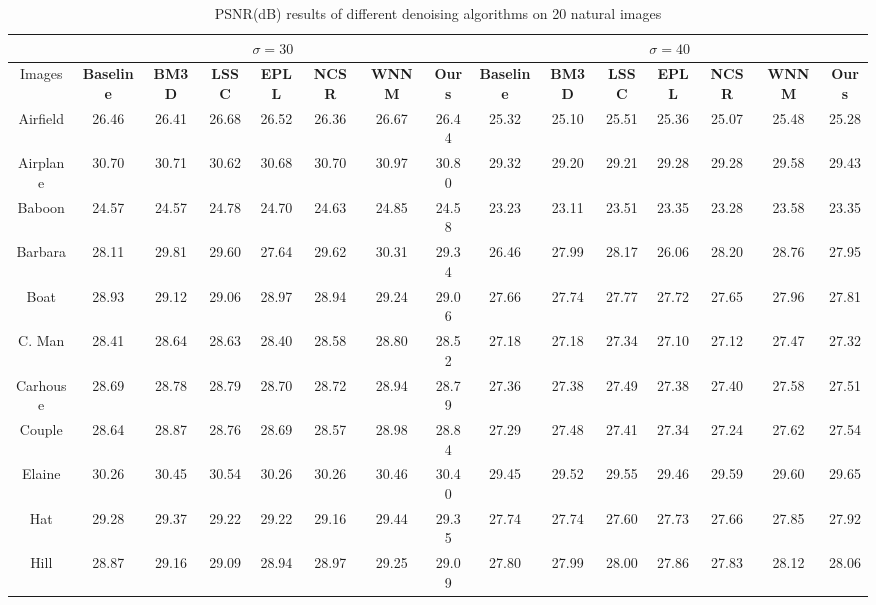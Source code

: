 \documentclass[10pt,twocolumn,letterpaper]{article}
\begin{document}
\begin{table*}[t]\label{tab1}
\caption{PSNR(dB) results of different denoising algorithms on 20 natural images}
\begin{center}
\renewcommand\arraystretch{1.0}
\scriptsize
\begin{tabular}{|c||c|c|c|c|c|c|c||c|c|c|c|c|c|c|}
\hline
&\multicolumn{7}{c||}{ $\sigma = 30$}&\multicolumn{7}{c|}{ $\sigma = 40$}
\\
\hline
\hline
Images&\textbf{Baseline}&\textbf{BM3D}&\textbf{LSSC}&\textbf{EPLL}&\textbf{NCSR}&\textbf{WNNM}&\textbf{Ours}&
\textbf{Baseline}&\textbf{BM3D}&\textbf{LSSC}&\textbf{EPLL}&\textbf{NCSR}&\textbf{WNNM}&\textbf{Ours} 
\\
\hline
Airfield&26.46& 26.41 & 26.68 & 26.52  &  26.36  & 26.67   & 26.44    &25.32 & 25.10 &  25.51  & 25.36 & 25.07 & 25.48 & 25.28  
\\
\hline
Airplane&30.70&  30.71  & 30.62  &  30.68  &  30.70 & 30.97  &  30.80   &29.32 & 29.20 & 29.21  & 29.28 & 29.28 & 29.58&29.43
\\
\hline
 Baboon&24.57 & 24.57   & 24.78  & 24.70   & 24.63  & 24.85 & 24.58   & 23.23 &  23.11 &  23.51  & 23.35 & 23.28 & 23.58&23.35   
\\
\hline 
 Barbara & 28.11& 29.81  & 29.60 & 27.64 & 29.62 & 30.31 & 29.34    & 26.46&  27.99 & 28.17 & 26.06 & 28.20 &28.76 & 27.95
\\
\hline
 Boat & 28.93& 29.12  & 29.06  & 28.97 & 28.94 & 29.24 &  29.06   &27.66 &  27.74& 27.77  &  27.72 & 27.65 &27.96  & 27.81    
\\
\hline
 C. Man& 28.41 & 28.64 & 28.63 & 28.40  & 28.58 & 28.80 & 28.52    & 27.18 &  27.18& 27.34  & 27.10 &27.12  &27.47 & 27.32
\\
\hline
 Carhouse &28.69& 28.78 & 28.79   & 28.70    & 28.72 & 28.94 & 28.79  & 27.36 &  27.38 &  27.49 & 27.38 & 27.40 & 27.58 &27.51
\\
\hline
 Couple& 28.64 & 28.87  & 28.76  & 28.69 & 28.57 & 28.98 & 28.84   & 27.29 &  27.48 & 27.41 &  27.34  & 27.24 & 27.62  & 27.54    
\\
\hline
 Elaine&30.26 & 30.45 & 30.54 & 30.26   &  30.26  & 30.46  & 30.40   &29.45 &29.52 & 29.55 & 29.46 & 29.59 & 29.60 & 29.65   
\\
\hline
 Hat & 29.28& 29.37 & 29.22  & 29.22   &  29.16  & 29.44   &  29.35   &27.74  & 27.74 & 27.60 &  27.73  &  27.66 & 27.85&27.92   
\\
\hline
 Hill &28.87 & 29.16 & 29.09 & 28.94 & 28.97 & 29.25 & 29.09    &27.80 & 27.99 & 28.00 & 27.86 & 27.83 & 28.12 & 28.06  

\end{tabular}
\end{center}
\end{table*}
\end{document}
